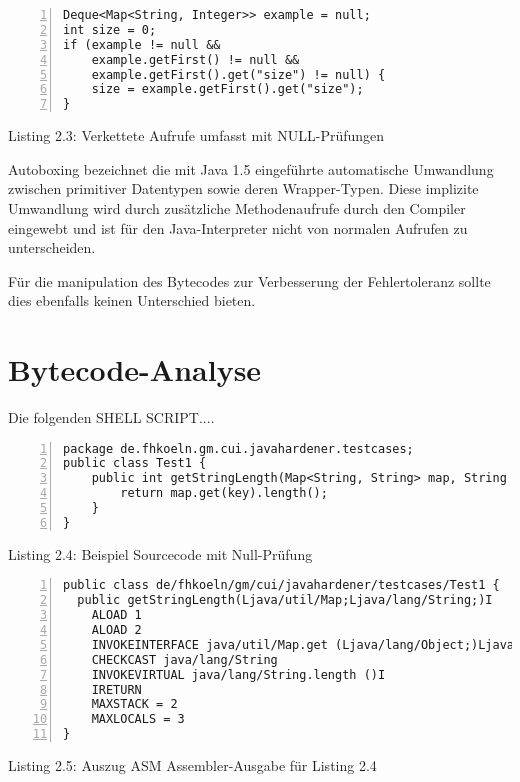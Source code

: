 \vspace{0.3cm}

\begin{lstlisting}[basicstyle=\ttfamily,numbers=left,numberstyle=\footnotesize\ttfamily,backgroundcolor=\color{source}]
Deque<Map<String, Integer>> example = null;
int size = 0;
if (example != null &&
	example.getFirst() != null &&
	example.getFirst().get("size") != null) {
	size = example.getFirst().get("size");
}
\end{lstlisting}
\centerline{Listing 2.3: Verkettete Aufrufe umfasst mit NULL-Prüfungen}

\vspace{0.3cm}

Autoboxing bezeichnet die mit Java 1.5 eingeführte automatische Umwandlung zwischen
primitiver Datentypen sowie deren Wrapper-Typen. Diese implizite Umwandlung wird
durch zusätzliche Methodenaufrufe durch den Compiler eingewebt und ist für den
Java-Interpreter nicht von normalen Aufrufen zu unterscheiden.

Für die manipulation des Bytecodes zur Verbesserung der Fehlertoleranz sollte
dies ebenfalls keinen Unterschied bieten.


\section{Bytecode-Analyse}

Die folgenden SHELL SCRIPT....



\begin{lstlisting}[basicstyle=\ttfamily,numbers=left,numberstyle=\footnotesize\ttfamily,backgroundcolor=\color{source}]
package de.fhkoeln.gm.cui.javahardener.testcases;
public class Test1 {
	public int getStringLength(Map<String, String> map, String key) {
		return map.get(key).length();
	}
}
\end{lstlisting}
\centerline{Listing 2.4: Beispiel Sourcecode mit Null-Prüfung}


\begin{lstlisting}[basicstyle=\ttfamily,numbers=left,numberstyle=\footnotesize\ttfamily,backgroundcolor=\color{source}]
public class de/fhkoeln/gm/cui/javahardener/testcases/Test1 {
  public getStringLength(Ljava/util/Map;Ljava/lang/String;)I
    ALOAD 1
    ALOAD 2
    INVOKEINTERFACE java/util/Map.get (Ljava/lang/Object;)Ljava/lang/Object;
    CHECKCAST java/lang/String
    INVOKEVIRTUAL java/lang/String.length ()I
    IRETURN
    MAXSTACK = 2
    MAXLOCALS = 3
}
\end{lstlisting}
\centerline{Listing 2.5: Auszug ASM Assembler-Ausgabe für Listing 2.4}


